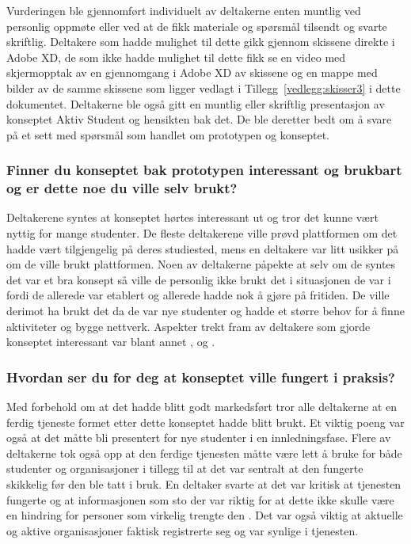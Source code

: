 Vurderingen ble gjennomført individuelt av deltakerne enten muntlig ved personlig oppmøte eller ved at de fikk materiale og spørsmål tilsendt og svarte skriftlig. Deltakere som hadde mulighet til dette gikk gjennom skissene direkte i Adobe XD, de som ikke hadde mulighet til dette fikk se en video med skjermopptak av en gjennomgang i Adobe XD av skissene og en mappe med bilder av de samme skissene som ligger vedlagt i Tillegg~\ref{vedlegg:skisser3} i dette dokumentet. Deltakerne ble også gitt en muntlig eller skriftlig presentasjon av konseptet Aktiv Student og hensikten bak det. De ble deretter bedt om å svare på et sett med spørsmål som handlet om prototypen og konseptet.

\subsubsection{Finner du konseptet bak prototypen interessant og brukbart og er dette noe du ville selv brukt?}
Deltakerene syntes at konseptet hørtes interessant ut og tror det kunne vært nyttig for mange studenter. De fleste deltakerene ville prøvd plattformen om det hadde vært tilgjengelig på deres studiested, mens en deltakere var litt usikker på om de ville brukt plattformen. Noen av deltakerne påpekte at selv om de syntes det var et bra konsept så ville de personlig ikke brukt det i situasjonen de var i fordi de allerede var etablert og allerede hadde nok å gjøre på fritiden. De ville derimot ha brukt det da de var nye studenter og hadde et større behov for å finne aktiviteter og bygge nettverk. Aspekter trekt fram av deltakere som gjorde konseptet interessant var blant annet ,  og .

\subsubsection{Hvordan ser du for deg at konseptet ville fungert i praksis?}

\setlength{\leftskip}{2em}
Med forbehold om at det hadde blitt godt markedsført tror alle deltakerne at en ferdig tjeneste formet etter dette konseptet hadde blitt brukt. Et viktig poeng var også at det måtte bli presentert for nye studenter i en innledningsfase. Flere av deltakerne tok også opp at den ferdige tjenesten måtte være lett å bruke for både studenter og organisasjoner i tillegg til at det var sentralt at den fungerte skikkelig før den ble tatt i bruk. En deltaker svarte at det var kritisk at tjenesten fungerte og at informasjonen som sto der var riktig for at dette ikke skulle være en hindring for personer som virkelig trengte den . Det var også viktig at aktuelle og aktive organisasjoner faktisk registrerte seg og var synlige i tjenesten. 

